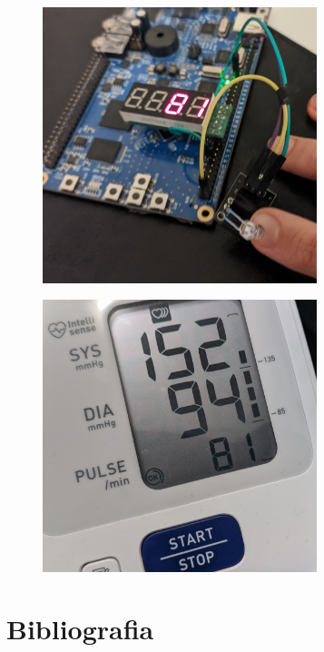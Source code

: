 \documentclass[a4paper,12pt]{article}
\begin{document}
\begin{figure}[htp]
    \centering
    \includegraphics[width=8cm]{img2.jpeg}
    \captionsetup{justification=centering,margin=2cm}
    \label{fig:neighbor_radius}
\end{figure}

\begin{figure}[htp]
    \centering
    \includegraphics[width=8cm]{img3.jpeg}
    \captionsetup{justification=centering,margin=2cm}
    \label{fig:neighbor_radius}
\end{figure}

\newpage
\section{Bibliografia}


\nocite{projekt}
\nocite{high}
\nocite{low}
\nocite{fireSpread}
\nocite{konceptModel}
\end{document}
